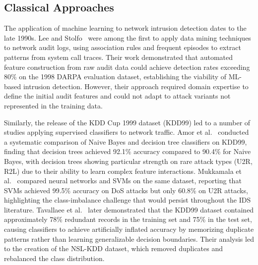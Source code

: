 \documentclass[12pt, letterpaper, oneside]{report}
\begin{document}
\subsection{Classical Approaches}

The application of machine learning to network intrusion detection dates to the late 1990s. Lee and Stolfo~\cite{lee1998} were among the first to apply data mining techniques to network audit logs, using association rules and frequent episodes to extract patterns from system call traces. Their work demonstrated that automated feature construction from raw audit data could achieve detection rates exceeding 80\% on the 1998 DARPA evaluation dataset, establishing the viability of ML-based intrusion detection. However, their approach required domain expertise to define the initial audit features and could not adapt to attack variants not represented in the training data.

Similarly, the release of the KDD Cup 1999 dataset (KDD99) led to a number of studies applying supervised classifiers to network traffic. Amor et al.~\cite{amor2004naive} conducted a systematic comparison of Naive Bayes and decision tree classifiers on KDD99, finding that decision trees achieved 92.1\% accuracy compared to 90.4\% for Naive Bayes, with decision trees showing particular strength on rare attack types (U2R, R2L) due to their ability to learn complex feature interactions. Mukkamala et al.~\cite{mukkamala2002intrusion} compared neural networks and SVMs on the same dataset, reporting that SVMs achieved 99.5\% accuracy on DoS attacks but only 60.8\% on U2R attacks, highlighting the class-imbalance challenge that would persist throughout the IDS literature. Tavallaee et al.~\cite{tavallaee2009} later demonstrated that the KDD99 dataset contained approximately 78\% redundant records in the training set and 75\% in the test set, causing classifiers to achieve artificially inflated accuracy by memorizing duplicate patterns rather than learning generalizable decision boundaries. Their analysis led to the creation of the NSL-KDD dataset, which removed duplicates and rebalanced the class distribution.
\end{document}
